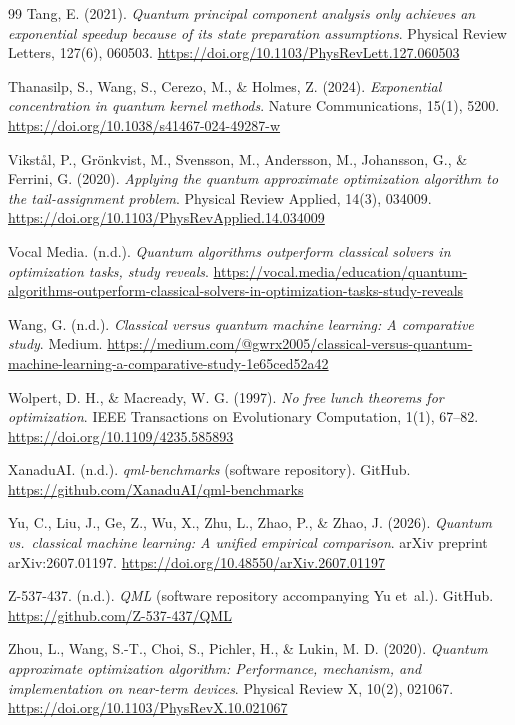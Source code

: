 \begin{thebibliography}{99}
	Tang, E. (2021).
	\emph{Quantum principal component analysis only achieves an exponential speedup because of its state preparation assumptions}.
	Physical Review Letters, 127(6), 060503.
	\url{https://doi.org/10.1103/PhysRevLett.127.060503}

	Thanasilp, S., Wang, S., Cerezo, M., \& Holmes, Z. (2024).
	\emph{Exponential concentration in quantum kernel methods}.
	Nature Communications, 15(1), 5200.
	\url{https://doi.org/10.1038/s41467-024-49287-w}

	Vikst{\aa}l, P., Gr\"onkvist, M., Svensson, M., Andersson, M., Johansson, G., \& Ferrini, G. (2020).
	\emph{Applying the quantum approximate optimization algorithm to the tail-assignment problem}.
	Physical Review Applied, 14(3), 034009.
	\url{https://doi.org/10.1103/PhysRevApplied.14.034009}

	Vocal Media. (n.d.).
	\emph{Quantum algorithms outperform classical solvers in optimization tasks, study reveals}.
	\url{https://vocal.media/education/quantum-algorithms-outperform-classical-solvers-in-optimization-tasks-study-reveals}

	Wang, G. (n.d.).
	\emph{Classical versus quantum machine learning: A comparative study}.
	Medium.
	\url{https://medium.com/@gwrx2005/classical-versus-quantum-machine-learning-a-comparative-study-1e65ced52a42}

	Wolpert, D. H., \& Macready, W. G. (1997).
	\emph{No free lunch theorems for optimization}.
	IEEE Transactions on Evolutionary Computation, 1(1), 67--82.
	\url{https://doi.org/10.1109/4235.585893}

	XanaduAI. (n.d.).
	\emph{qml-benchmarks} (software repository).
	GitHub.
	\url{https://github.com/XanaduAI/qml-benchmarks}

	Yu, C., Liu, J., Ge, Z., Wu, X., Zhu, L., Zhao, P., \& Zhao, J. (2026).
	\emph{Quantum vs.\ classical machine learning: A unified empirical comparison}.
	arXiv preprint arXiv:2607.01197.
	\url{https://doi.org/10.48550/arXiv.2607.01197}

	Z-537-437. (n.d.).
	\emph{QML} (software repository accompanying Yu et~al.).
	GitHub.
	\url{https://github.com/Z-537-437/QML}

	Zhou, L., Wang, S.-T., Choi, S., Pichler, H., \& Lukin, M. D. (2020).
	\emph{Quantum approximate optimization algorithm: Performance, mechanism, and implementation on near-term devices}.
	Physical Review X, 10(2), 021067.
	\url{https://doi.org/10.1103/PhysRevX.10.021067}

\end{thebibliography}

